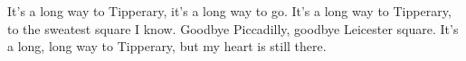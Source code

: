 \beginverse*
It’s a long way to Tipperary,
it’s a long way to go.
It’s a long way to Tipperary,
to the sweatest square I know.
Goodbye Piccadilly,
goodbye Leicester square.
It’s a long, long way to Tipperary,
but my heart is still there.
\endverse
\endsong